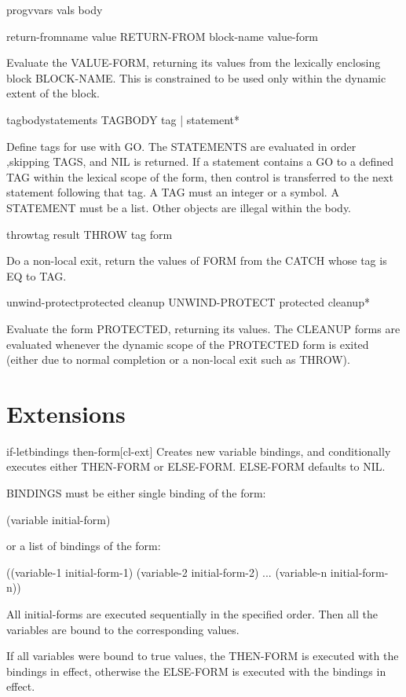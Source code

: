 \documentclass[10pt,english]{book}
\begin{document}
\begin{specialop}{progv}{vars vals \body body}
  
\end{specialop}

\begin{specialop}{return-from}{name \op value}
  RETURN-FROM block-name value-form

Evaluate the VALUE-FORM, returning its values from the lexically enclosing
block BLOCK-NAME. This is constrained to be used only within the dynamic
extent of the block.
\end{specialop}

\begin{specialop}{tagbody}{\rest statements}
  TAGBODY {tag | statement}*

Define tags for use with GO. The STATEMENTS are evaluated in order ,skipping
TAGS, and NIL is returned. If a statement contains a GO to a defined TAG
within the lexical scope of the form, then control is transferred to the next
statement following that tag. A TAG must an integer or a symbol. A STATEMENT
must be a list. Other objects are illegal within the body.
\end{specialop}

\begin{specialop}{throw}{tag result}
  THROW tag form

Do a non-local exit, return the values of FORM from the CATCH whose tag is EQ
to TAG.
\end{specialop}

\begin{specialop}{unwind-protect}{protected \body cleanup}
  UNWIND-PROTECT protected cleanup*

Evaluate the form PROTECTED, returning its values. The CLEANUP forms are
evaluated whenever the dynamic scope of the PROTECTED form is exited (either
due to normal completion or a non-local exit such as THROW).
\end{specialop}

\section{Extensions}
\label{sec:extensions}

\begin{macro}{if-let}{bindings \body then-form}[cl-ext]
  Creates new variable bindings, and conditionally executes either
THEN-FORM or ELSE-FORM. ELSE-FORM defaults to NIL.

BINDINGS must be either single binding of the form:

 (variable initial-form)

or a list of bindings of the form:

 ((variable-1 initial-form-1)
  (variable-2 initial-form-2)
  ...
  (variable-n initial-form-n))

All initial-forms are executed sequentially in the specified order. Then all
the variables are bound to the corresponding values.

If all variables were bound to true values, the THEN-FORM is executed with the
bindings in effect, otherwise the ELSE-FORM is executed with the bindings in
effect.
\end{macro}
\end{document}
